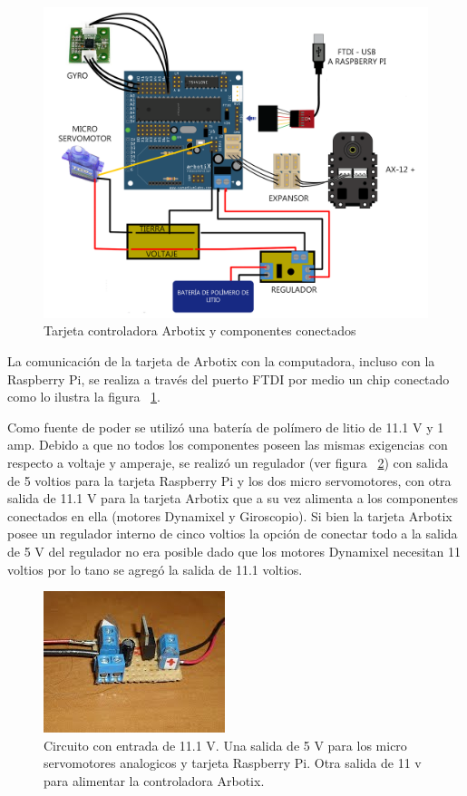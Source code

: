 \begin{figure}[hbtp]
\centering
\includegraphics[scale=0.2]{imagenes/arbotix_servo.png}
\caption{Tarjeta controladora Arbotix y componentes conectados }
\label{fig:arbotixConectados}
\end{figure}

La comunicación de la tarjeta de Arbotix con la computadora, incluso con la Raspberry Pi, se realiza a través del puerto FTDI por medio un chip conectado como lo ilustra la figura ~\ref{fig:arbotixConectados}.

Como fuente de poder se utilizó una batería de polímero de litio de 11.1 V y 1 amp. Debido a que no todos los componentes poseen las mismas exigencias con respecto a voltaje y amperaje, se realizó un regulador (ver figura ~\ref{fig:circuito}) con  salida de 5 voltios para la tarjeta Raspberry Pi y los dos micro servomotores, con otra salida de 11.1 V para la tarjeta Arbotix que a su vez alimenta a los componentes conectados en ella (motores Dynamixel y Giroscopio). Si bien la tarjeta Arbotix posee un regulador interno de cinco voltios la opción de conectar todo a la salida de 5 V del regulador no era posible dado que los motores Dynamixel necesitan 11 voltios por lo tano se agregó la salida de 11.1 voltios.

\begin{figure}[hbtp]
\centering
\includegraphics[scale=0.5]{imagenes/circuito.jpg}
\caption{Circuito con entrada de 11.1 V. Una salida de 5 V para los micro servomotores analogicos y tarjeta Raspberry Pi. Otra salida de 11 v para alimentar la controladora Arbotix.}
\label{fig:circuito}
\end{figure}

